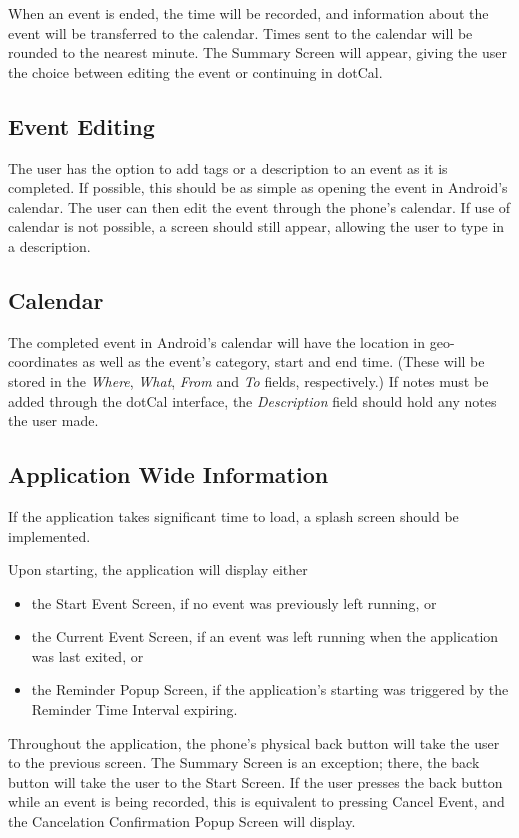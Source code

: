\documentclass[11pt]{article}
\newcommand{\bt}[1]{{\sc #1}}
\begin{document}
When an event is ended, the time will be recorded, and information about the event will be transferred to the calendar. Times sent to the calendar will be rounded to the nearest minute. The Summary Screen will appear, giving the user the choice between editing the event or continuing in dotCal.


\subsection{Event Editing}

The user has the option to add tags or a description to an event as it is completed. If possible, this should be as simple as opening the event in Android's calendar. The user can then edit the event through the phone's calendar. If use of calendar is not possible, a screen should still appear, allowing the user to type in a description.

\subsection{Calendar}
The completed event in Android's calendar will have the location in geo-coordinates as well as the event's category, start and end time. (These will be stored in the \emph{Where}, \emph{What}, \emph{From} and \emph{To} fields, respectively.) If notes must be added through the dotCal interface, the \emph{Description} field should hold any notes the user made.

\subsection{Application Wide Information}

If the application takes significant time to load, a splash screen should be implemented.

Upon starting, the application will display either
\begin{itemize}
	\item{the Start Event Screen, if no event was previously left running, or}
	\item{the Current Event Screen, if an event was left running when the application was last exited, or}
	\item{the Reminder Popup Screen, if the application's starting was triggered by the Reminder Time Interval expiring.}
\end{itemize}

Throughout the application, the phone's physical back button will take the user to the previous screen. The Summary Screen is an exception; there, the back button will take the user to the Start Screen.  If the user presses the back button while an event is being recorded, this is equivalent to pressing \bt{Cancel Event}, and the Cancelation Confirmation Popup Screen will display.
\end{document}
